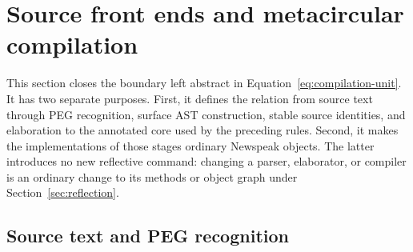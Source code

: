 \section{Source front ends and metacircular compilation}
\label{sec:front-end}

This section closes the boundary left abstract in
Equation~\eqref{eq:compilation-unit}.  It has two separate purposes.  First,
it defines the relation from source text through PEG recognition, surface AST
construction, stable source identities, and elaboration to the annotated core
used by the preceding rules.  Second, it makes the implementations of those
stages ordinary Newspeak objects.  The latter introduces no new reflective
command: changing a parser, elaborator, or compiler is an ordinary change to
its methods or object graph under Section~\ref{sec:reflection}.

\subsection{Source text and PEG recognition}
\label{sec:peg-recognition}

